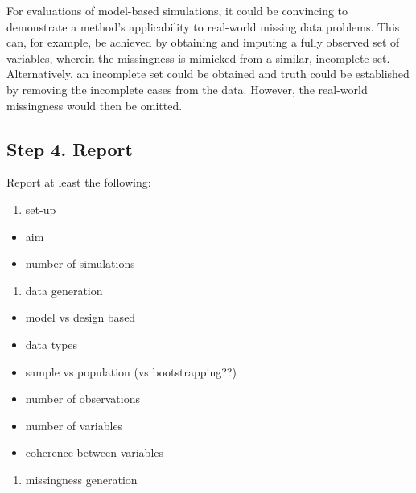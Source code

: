 \documentclass[
]{article}
\providecommand{\tightlist}{%
  \setlength{\itemsep}{0pt}\setlength{\parskip}{0pt}}
\begin{document}
For evaluations of model-based simulations, it could be convincing to
demonstrate a method's applicability to real-world missing data
problems. This can, for example, be achieved by obtaining and imputing a
fully observed set of variables, wherein the missingness is mimicked
from a similar, incomplete set. Alternatively, an incomplete set could
be obtained and truth could be established by removing the incomplete
cases from the data. However, the real-world missingness would then be
omitted.

\hypertarget{step-4.-report}{%
\subsection{Step 4. Report}\label{step-4.-report}}

Report at least the following:

\begin{enumerate}
\def\labelenumi{\arabic{enumi}.}
\tightlist
\item
  set-up
\end{enumerate}

\begin{itemize}
\tightlist
\item
  aim
\item
  number of simulations
\end{itemize}

\begin{enumerate}
\def\labelenumi{\arabic{enumi}.}
\setcounter{enumi}{1}
\tightlist
\item
  data generation
\end{enumerate}

\begin{itemize}
\tightlist
\item
  model vs design based
\item
  data types
\item
  sample vs population (vs bootstrapping??)
\item
  number of observations
\item
  number of variables
\item
  coherence between variables
\end{itemize}

\begin{enumerate}
\def\labelenumi{\arabic{enumi}.}
\setcounter{enumi}{2}
\tightlist
\item
  missingness generation
\end{enumerate}
\end{document}
